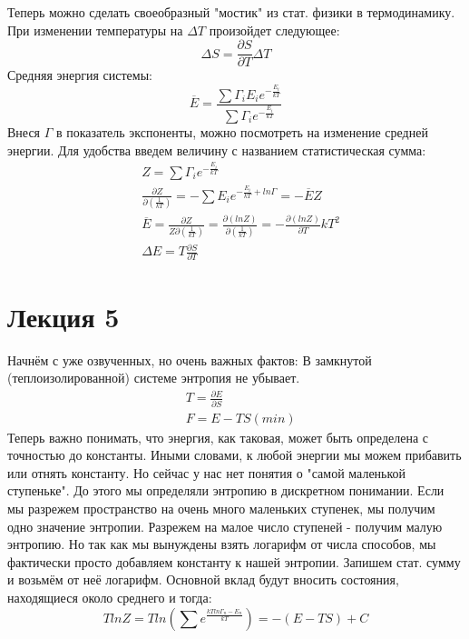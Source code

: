 \documentclass[a4paper, 12pt]{article}
\begin{document}
	Теперь можно сделать своеобразный "мостик" из стат. физики в термодинамику. При изменении температуры на $\Delta T$ произойдет следующее:
	\begin{equation*}	
		\Delta S = \frac{\partial S}{\partial T} \Delta T
	\end{equation*}
	Средняя энергия системы:
	$$
	\overline{E} = \frac{\sum \Gamma_{i} E_{i} e^{-\frac{E_{i}}{kT}}  }{\sum \Gamma_{i}  e^{-\frac{E_{i}}{kT}} }
	$$
	Внеся $\Gamma$ в показатель экспоненты, можно посмотреть на изменение средней энергии. Для удобства введем величину с названием статистическая сумма:
	\begin{equation*}
		\begin{aligned}
			& Z = \sum \Gamma_{i}  e^{-\frac{E_{i}}{kT}}                                                                                                                       \\
			& \frac{\partial Z}{\partial (\frac{1}{kT})} = - \sum E_{i}  e^{-\frac{E_{i}}{kT}+ ln \Gamma} = - \overline{E} Z                                                   \\
			& \overline{E} = \frac{\partial Z}{Z \partial (\frac{1}{kT}) } =  \frac{\partial (lnZ)}{ \partial (\frac{1}{kT}) } =  -\frac{\partial (lnZ)}{ \partial T } k T^{2} \\
			& \Delta E = T \frac{\partial S}{\partial T}                                                                                                                       
		\end{aligned}
	\end{equation*}
	\section{Лекция 5}
	Начнём с уже озвученных, но очень важных фактов:
	В замкнутой (теплоизолированной) системе энтропия не убывает.
	\begin{equation*}
		\begin{aligned}
			& T = \frac{\partial E}{\partial S} \\
			& F = E - TS (min)                  
		\end{aligned}
	\end{equation*}
	Теперь важно понимать, что энергия, как таковая, может быть определена с точностью до константы. Иными словами, к любой энергии мы можем прибавить или отнять константу. Но сейчас у нас нет понятия о "самой маленькой ступеньке". До этого мы определяли энтропию в дискретном понимании. Если мы разрежем пространство на очень много маленьких ступенек, мы получим одно значение энтропии. Разрежем на малое число ступеней - получим малую энтропию. Но так как мы вынуждены взять логарифм от числа способов, мы фактически просто добавляем константу к нашей энтропии. 
	Запишем стат. сумму и возьмём от неё логарифм. Основной вклад будут вносить состояния, находящиеся около среднего и тогда:
	\begin{equation*}
		TlnZ= Tln (\sum e^{\frac{kTln \Gamma_{n} - E_{n}} {kT}}) = -(E-TS)+C
	\end{equation*}
\end{document}
